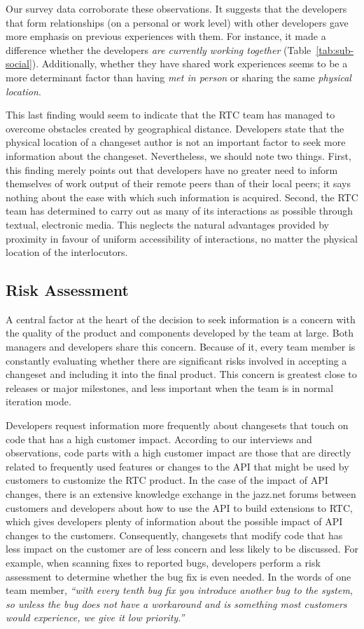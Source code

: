 Our survey data corroborate these observations. It suggests that the developers that form relationships (on a personal or work level) with other developers gave more emphasis on previous experiences with them. For instance, it made a difference whether the developers \emph{are currently working together} (Table~\ref{tab:sub-social}). Additionally, whether they have shared work experiences seems to be a more determinant factor than having \emph{met in person} or sharing the same \emph{physical location}.

This last finding would seem to indicate that the RTC team has managed to overcome obstacles created by geographical distance. Developers state that the physical location of a changeset author is not an important factor to seek more information about the changeset. Nevertheless, we should note two things. First, this finding merely points out that developers have no greater need to inform themselves of work output of their remote peers than of their local peers; it says nothing about the ease with which such information is acquired. Second, the RTC team has determined to carry out as many of its interactions as possible through textual, electronic media. This neglects the natural advantages provided by proximity in favour of uniform accessibility of interactions, no matter the physical location of the interlocutors.



\subsection{Risk Assessment}
A central factor at the heart of the decision to seek information is a concern with the quality of the product and components developed by the team at large. Both managers and developers share this concern. Because of it, every team member is constantly evaluating whether there are significant risks involved in accepting a changeset and including it into the final product. This concern is greatest close to releases or major milestones, and less important when the team is in normal iteration mode.

Developers request information more frequently about changesets that touch on code that has a high customer impact. According to our interviews and observations, code parts with a high customer impact are those that are directly related to frequently used features or changes to the API that might be used by customers to customize the RTC product. In the case of the impact of API changes, there is an extensive knowledge exchange in the jazz.net forums between customers and developers about how to use the API to build extensions to RTC, which gives developers plenty of information about the possible impact of API changes to the customers. Consequently, changesets that modify code that has less impact on the customer are of less concern and less likely to be discussed. For example, when scanning fixes to reported bugs, developers perform a risk assessment to determine whether the bug fix is even needed. In the words of one team member, \emph{``with every tenth bug fix you introduce another bug to the system, so unless the bug does not have a workaround and is something most customers would experience, we give it low priority.''}

